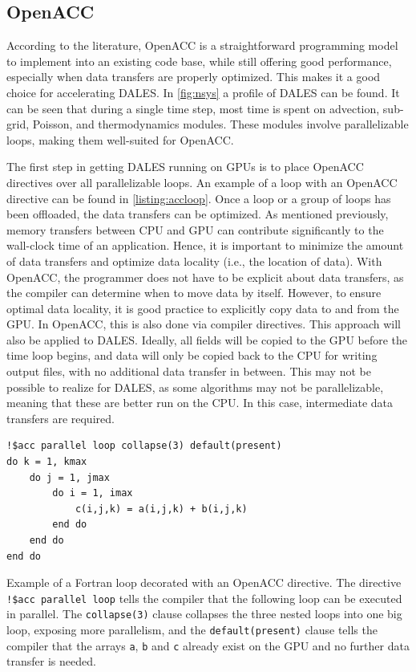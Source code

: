 \subsection{OpenACC}
According to the literature, OpenACC is a straightforward programming model to implement into an existing code base, while still offering good performance, especially when data transfers are properly optimized. This makes it a good choice for accelerating DALES. In \autoref{fig:nsys} a profile of DALES can be found. It can be seen that during a single time step, most time is spent on advection, sub-grid, Poisson, and thermodynamics modules. These modules involve parallelizable loops, making them well-suited for OpenACC.

The first step in getting DALES running on GPUs is to place OpenACC directives over all parallelizable loops. An example of a loop with an OpenACC directive can be found in \autoref{listing:accloop}. Once a loop or a group of loops has been offloaded, the data transfers can be optimized. As mentioned previously, memory transfers between CPU and GPU can contribute significantly to the wall-clock time of an application. Hence, it is important to minimize the amount of data transfers and optimize data locality (i.e., the location of data). With OpenACC, the programmer does not have to be explicit about data transfers, as the compiler can determine when to move data by itself. However, to ensure optimal data locality, it is good practice to explicitly copy data to and from the GPU. In OpenACC, this is also done via compiler directives. This approach will also be applied to DALES. Ideally, all fields will be copied to the GPU before the time loop begins, and data will only be copied back to the CPU for writing output files, with no additional data transfer in between. This may not be possible to realize for DALES, as some algorithms may not be parallelizable, meaning that these are better run on the CPU. In this case, intermediate data transfers are required.

\begin{listing}[H]
\begin{verbatim}
!$acc parallel loop collapse(3) default(present)
do k = 1, kmax
    do j = 1, jmax
        do i = 1, imax
            c(i,j,k) = a(i,j,k) + b(i,j,k)
        end do
    end do
end do
\end{verbatim}
\caption{Example of a Fortran loop decorated with an OpenACC directive. The directive \texttt{!\$acc parallel loop} tells the compiler that the following loop can be executed in parallel. The \texttt{collapse(3)} clause collapses the three nested loops into one big loop, exposing more parallelism, and the \texttt{default(present)} clause tells the compiler that the arrays \texttt{a}, \texttt{b} and \texttt{c} already exist on the GPU and no further data transfer is needed.}
\label{listing:accloop}
\end{listing}

